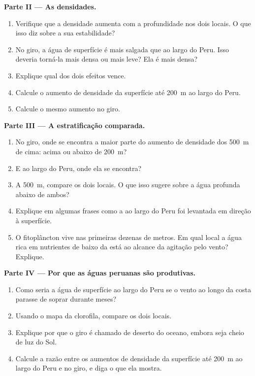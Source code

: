\begin{problem}
\medskip
\noindent\textbf{Parte II --- As densidades.}
\begin{enumerate}[resume]
  \item Verifique que a densidade aumenta com a profundidade nos dois locais.
        O que isso diz sobre a sua estabilidade?
  \item No giro, a água de superfície é mais salgada que ao largo do Peru.
        Isso deveria torná-la mais densa ou mais leve? Ela é mais densa?
  \item Explique qual dos dois efeitos vence.
  \item Calcule o aumento de densidade da superfície até \qty{200}{m} ao
        largo do Peru.
  \item Calcule o mesmo aumento no giro.
\end{enumerate}

\medskip
\noindent\textbf{Parte III --- A estratificação comparada.}
\begin{enumerate}[resume]
  \item No giro, onde se encontra a maior parte do aumento de densidade dos
        \qty{500}{m} de cima: acima ou abaixo de \qty{200}{m}?
  \item E ao largo do Peru, onde ela se encontra?
  \item A \qty{500}{m}, compare os dois locais. O que isso sugere sobre a
        água profunda abaixo de ambos?
  \item Explique em algumas frases como a  ao largo do Peru foi
        levantada em direção à superfície.
  \item O fitoplâncton vive nas primeiras dezenas de metros. Em qual local a
        água rica em nutrientes de baixo da  está ao alcance da
        agitação pelo vento? Explique.
\end{enumerate}

\medskip
\noindent\textbf{Parte IV --- Por que as águas peruanas são produtivas.}
\begin{enumerate}[resume]
  \item Como seria a água de superfície ao largo do Peru se o vento ao longo
        da costa parasse de soprar durante meses?
  \item Usando o mapa da clorofila, compare os dois locais.
  \item Explique por que o giro é chamado de deserto do oceano, embora seja
        cheio de luz do Sol.
  \item Calcule a razão entre os aumentos de densidade da superfície até
        \qty{200}{m} ao largo do Peru e no giro, e diga o que ela mostra.
\end{enumerate}
\end{problem}
